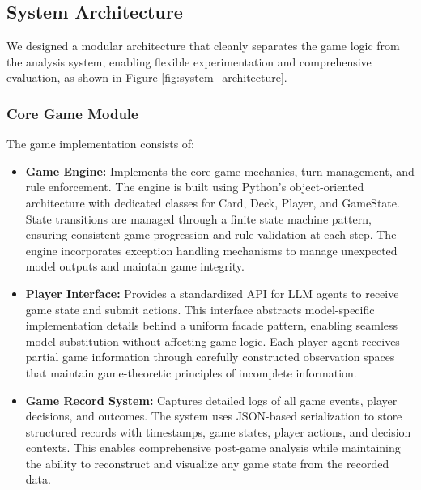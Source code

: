 \documentclass{article}
\begin{document}
\subsection{System Architecture}
We designed a modular architecture that cleanly separates the game logic from the analysis system, enabling flexible experimentation and comprehensive evaluation, as shown in Figure \ref{fig:system_architecture}.

\subsubsection{Core Game Module}
The game implementation consists of:
\begin{itemize}
    \item \textbf{Game Engine:} Implements the core game mechanics, turn management, and rule enforcement. The engine is built using Python's object-oriented architecture with dedicated classes for Card, Deck, Player, and GameState. State transitions are managed through a finite state machine pattern, ensuring consistent game progression and rule validation at each step. The engine incorporates exception handling mechanisms to manage unexpected model outputs and maintain game integrity.
    
    \item \textbf{Player Interface:} Provides a standardized API for LLM agents to receive game state and submit actions. This interface abstracts model-specific implementation details behind a uniform facade pattern, enabling seamless model substitution without affecting game logic. Each player agent receives partial game information through carefully constructed observation spaces that maintain game-theoretic principles of incomplete information.
    
    \item \textbf{Game Record System:} Captures detailed logs of all game events, player decisions, and outcomes. The system uses JSON-based serialization to store structured records with timestamps, game states, player actions, and decision contexts. This enables comprehensive post-game analysis while maintaining the ability to reconstruct and visualize any game state from the recorded data.
\end{itemize}
\end{document}
